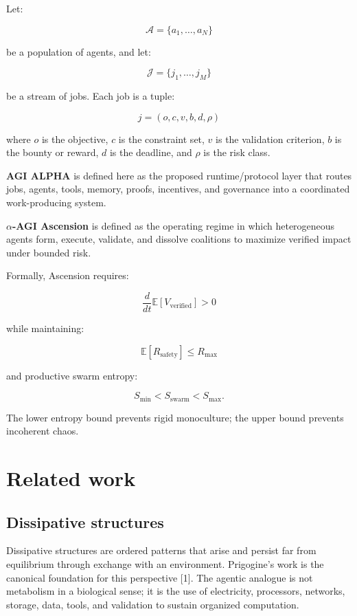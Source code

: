 \documentclass[
  11pt,
]{article}
\begin{document}
Let:

\[
\mathcal{A}=\{a_1,\ldots,a_N\}
\]

be a population of agents, and let:

\[
\mathcal{J}=\{j_1,\ldots,j_M\}
\]

be a stream of jobs. Each job is a tuple:

\[
j=(o,c,v,b,d,\rho)
\]

where \(o\) is the objective, \(c\) is the constraint set, \(v\) is the
validation criterion, \(b\) is the bounty or reward, \(d\) is the
deadline, and \(\rho\) is the risk class.

\textbf{AGI ALPHA} is defined here as the proposed runtime/protocol
layer that routes jobs, agents, tools, memory, proofs, incentives, and
governance into a coordinated work-producing system.

\textbf{$\alpha$-AGI Ascension} is defined as the operating regime in which
heterogeneous agents form, execute, validate, and dissolve coalitions to
maximize verified impact under bounded risk.

Formally, Ascension requires:

\[
\frac{d}{dt}\mathbb{E}[V_{\text{verified}}] > 0
\]

while maintaining:

\[
\mathbb{E}[R_{\text{safety}}] \leq R_{\max}
\]

and productive swarm entropy:

\[
S_{\min}<S_{\text{swarm}}<S_{\max}.
\]

The lower entropy bound prevents rigid monoculture; the upper bound
prevents incoherent chaos.

\section{Related work}\label{related-work}

\subsection{Dissipative structures}\label{dissipative-structures}

Dissipative structures are ordered patterns that arise and persist far
from equilibrium through exchange with an environment. Prigogine's work
is the canonical foundation for this perspective {[}1{]}. The agentic
analogue is not metabolism in a biological sense; it is the use of
electricity, processors, networks, storage, data, tools, and validation
to sustain organized computation.
\end{document}
